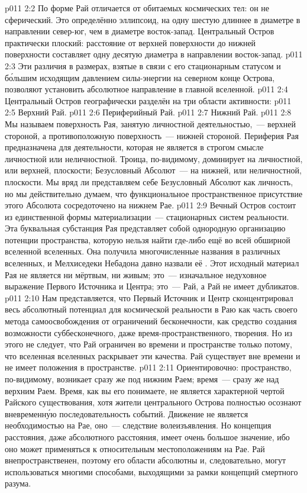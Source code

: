 \vs p011 2:2 \pc По форме Рай отличается от обитаемых космических тел: он не сферический. Это определённо эллипсоид, на одну шестую длиннее в диаметре в направлении север\hyp{}юг, чем в диаметре восток\hyp{}запад. Центральный Остров практически плоский: расстояние от верхней поверхности до нижней поверхности составляет одну десятую диаметра в направлении восток\hyp{}запад.
\vs p011 2:3 Эти различия в размерах, взятые в связи с его стационарным статусом и б\'ольшим исходящим давлением силы\hyp{}энергии на северном конце Острова, позволяют установить абсолютное направление в главной вселенной.
\vs p011 2:4 \pc Центральный Остров географически разделён на три области активности:
\vs p011 2:5 Верхний Рай.
\vs p011 2:6 Периферийный Рай.
\vs p011 2:7 Нижний Рай.
\vs p011 2:8 \pc Мы называем поверхность Рая, занятую личностной деятельностью,~--- верхней стороной, а противоположную поверхность~--- нижней стороной. Периферия Рая предназначена для деятельности, которая не является в строгом смысле личностной или неличностной. Троица, по\hyp{}видимому, доминирует на личностной, или верхней, плоскости; Безусловный Абсолют~--- на нижней, или неличностной, плоскости. Мы вряд ли представляем себе Безусловный Абсолют как личность, но мы действительно думаем, что функциональное пространственное присутствие этого Абсолюта сосредоточено на нижнем Рае.
\vs p011 2:9 \pc Вечный Остров состоит из единственной формы материализации~--- стационарных систем реальности. Эта буквальная субстанция Рая представляет собой однородную организацию потенции пространства, которую нельзя найти где\hyp{}либо ещё во всей обширной вселенной вселенных. Она получила многочисленные названия в различных вселенных, и Мелхиседеки Небадона давно назвали её . Этот исходный материал Рая не является ни мёртвым, ни живым; это~--- изначальное недуховное выражение Первого Источника и Центра; это~--- Рай, а Рай не имеет дубликатов.
\vs p011 2:10 Нам представляется, что Первый Источник и Центр сконцентрировал весь абсолютный потенциал для космической реальности в Раю как часть своего метода самоосвобождения от ограничений бесконечности, как средство создания возможности суббесконечного, даже время\hyp{}пространственного, творения. Но из этого не следует, что Рай ограничен во времени и пространстве только потому, что вселенная вселенных раскрывает эти качества. Рай существует вне времени и не имеет положения в пространстве.
\vs p011 2:11 Ориентировочно: пространство, по\hyp{}видимому, возникает сразу же под нижним Раем; время~--- сразу же над верхним Раем. Время, как вы его понимаете, не является характерной чертой Райского существования, хотя жители центрального Острова полностью осознают вневременн\'ую последовательность событий. Движение не является необходимостью на Рае, оно~--- следствие волеизъявления. Но концепция расстояния, даже абсолютного расстояния, имеет очень большое значение, ибо оно может применяться к относительным местоположениям на Рае. Рай внепространственен, поэтому его области абсолютны и, следовательно, могут использоваться многими способами, выходящими за рамки концепций смертного разума.
